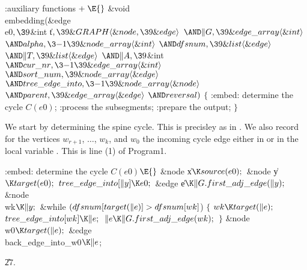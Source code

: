 \Y\B\4:auxiliary functions\X${}\mathrel+\E{}$\6
\&{void} \\{embedding}(\&{edge} \\{e0}${},\39{}$\&{int} \|t${},\39\&{GRAPH}%
\langle\&{node},\39\&{edge}\rangle{}$ ${}{\AND}\|G,\39\&{edge\_array}\langle%
\&{int}\rangle{}$ ${}{\AND}\\{alpha},\3{-1}\39\&{node\_array}\langle\&{int}%
\rangle{}$ ${}{\AND}\\{dfsnum},\39\&{list}\langle\&{edge}\rangle{}$ ${}{\AND}%
\|T,\39\&{list}\langle\&{edge}\rangle{}$ ${}{\AND}\|A,\39{}$\&{int} ${}{\AND}%
\\{cur\_nr},\3{-1}\39\&{edge\_array}\langle\&{int}\rangle{}$ ${}{\AND}\\{sort%
\_num},\39\&{node\_array}\langle\&{edge}\rangle{}$ ${}{\AND}\\{tree\_edge%
\_into},\3{-1}\39\&{node\_array}\langle\&{node}\rangle{}$ ${}{\AND}\\{parent},%
\39\&{edge\_array}\langle\&{edge}\rangle{}$ ${}{\AND}\\{reversal}){}$\1\1\2\2\6
${}\{{}$\1\6
:embed: determine the cycle $C(e0)$\X;\6
:process the subsegments\X;\6
:prepare the output\X;\6
\4${}\}{}$\2\par
\fi

We start by determining the spine cycle. This is precisley as in .
We also record for the vertices $w_{r+1}$, $\ldots$, $w_k$, and $w_0$ the
incoming cycle edge either in  or in the local
variable . This is line (1) of Program1.

\Y\B\4:embed: determine the cycle $C(e0)$\X${}\E{}$\6
\&{node} \|x${}\K\\{source}(\\{e0});{}$\6
\&{node} \|y${}\K\\{target}(\\{e0});{}$\7
${}\\{tree\_edge\_into}[\|y]\K\\{e0};{}$\7
\&{edge} \|e${}\K\|G.\\{first\_adj\_edge}(\|y);{}$\6
\&{node} \\{wk}${}\K\|y;{}$\7
\&{while} ${}(\\{dfsnum}[\\{target}(\|e)]>\\{dfsnum}[\\{wk}]{}$)\6
${}\{{}$\1\6
${}\\{wk}\K\\{target}(\|e);{}$\6
${}\\{tree\_edge\_into}[\\{wk}]\K\|e;{}$\6
${}\|e\K\|G.\\{first\_adj\_edge}(\\{wk});{}$\6
\4${}\}{}$\2\7
\&{node} \\{w0}${}\K\\{target}(\|e);{}$\6
\&{edge} \\{back\_edge\_into\_w0}${}\K\|e{}$;\par
\U27.\fi

